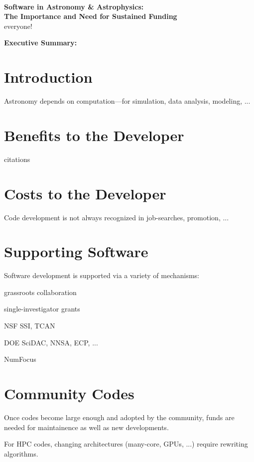 \documentclass[11pt]{article}
\begin{document}
\thispagestyle{plain}

\mbox{ }\vspace{-0.7in}

\begin{center}
{\Large \sffamily \bfseries Software in Astronomy \& Astrophysics:\\The Importance and Need for Sustained Funding} \\
{
everyone!
}
\end{center}

\begin{tcolorbox}
{\sffamily \bfseries Executive Summary:} 
\end{tcolorbox}

\section{Introduction}

Astronomy depends on computation---for simulation, data analysis, modeling, ...


\section{Benefits to the Developer}

citations


\section{Costs to the Developer}

Code development is not always recognized in job-searches, promotion, ...



\section{Supporting Software}

Software development is supported via a variety of mechanisms:

grassroots collaboration

single-investigator grants

NSF SSI, TCAN

DOE SciDAC, NNSA, ECP, ...

NumFocus


\section{Community Codes}

Once codes become large enough and adopted by the community, funds are
needed for maintainence as well as new developments.

For HPC codes, changing architectures (many-core, GPUs, ...) require rewriting
algorithms.
\end{document}
